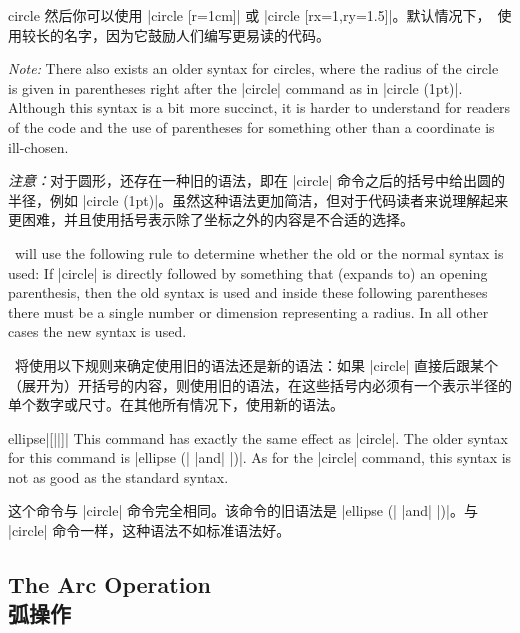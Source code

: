 \begin{pathoperation}{circle}{}
    然后你可以使用 |circle [r=1cm]| 或 |circle [rx=1,ry=1.5]|。默认情况下，\tikzname\ 使用较长的名字，因为它鼓励人们编写更易读的代码。


    \emph{Note:} There also exists an older syntax for circles, where the
    radius of the circle is given in parentheses right after the |circle|
    command as in |circle (1pt)|. Although this syntax is a bit more succinct,
    it is harder to understand for readers of the code and the use of
    parentheses for something other than a coordinate is ill-chosen.

    \emph{注意：}对于圆形，还存在一种旧的语法，即在 |circle| 命令之后的括号中给出圆的半径，例如 |circle (1pt)|。虽然这种语法更加简洁，但对于代码读者来说理解起来更困难，并且使用括号表示除了坐标之外的内容是不合适的选择。


    \tikzname\ will use the following rule to determine whether the old or the
    normal syntax is used: If |circle| is directly followed by something that
    (expands to) an opening parenthesis, then the old syntax is used and inside
    these following parentheses there must be a single number or dimension
    representing a radius. In all other cases the new syntax is used.

    \tikzname\ 将使用以下规则来确定使用旧的语法还是新的语法：如果 |circle| 直接后跟某个（展开为）开括号的内容，则使用旧的语法，在这些括号内必须有一个表示半径的单个数字或尺寸。在其他所有情况下，使用新的语法。
\end{pathoperation}

\begin{pathoperation}{ellipse}{|[||]|}
    This command has exactly the same effect as |circle|. The older syntax for
    this command is |ellipse (| |and| |)|. As for
    the |circle| command, this syntax is not as good as the standard syntax.
    
    
    这个命令与 |circle| 命令完全相同。该命令的旧语法是 |ellipse (| |and| |)|。与 |circle| 命令一样，这种语法不如标准语法好。
%
\begin{codeexample}[]
\end{codeexample}
\end{pathoperation}


\subsection{The Arc Operation\\弧操作}

